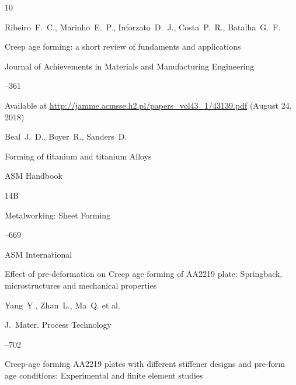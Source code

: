 \begin{thebibliography}{10}




\by Ribeiro~F.~C., Marinho~E.~P., Inforzato~D.~J., Costa~P.~R., Batalha~G.~F. 

\paper Creep age forming: a short review of fundaments and applications 

\jour Journal of Achievements in Materials and Manufacturing Engineering




--361

\elink Available at \url{http://jamme.acmsse.h2.pl/papers_vol43_1/43139.pdf} (August 24, 2018)






\by Beal~J.~D., Boyer~R., Sanders~D.

\paper Forming of titanium and titanium Alloys  

\inbook ASM Handbook 

\bookvol 14B

\volinfo Metalworking: Sheet Forming


--669

\publaddr  ASM International








\paper Effect of pre-deformation on Creep age forming of AA2219 plate: Springback, microstructures and mechanical properties

\by Yang~Y., Zhan~L., Ma~Q. et al.

\jour J.~Mater. Process Technology


--702   







\paper Creep-age forming AA2219 plates with different stiffener designs and pre-form age conditions: Experimental and finite element studies


\end{thebibliography}
